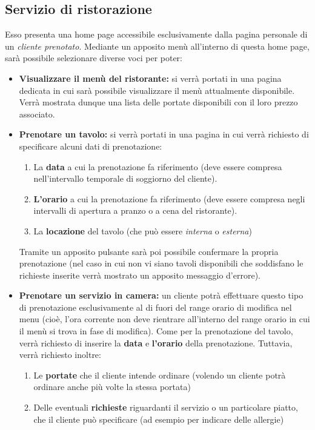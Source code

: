 \documentclass [a4paper, 12pt]{book}
\begin{document}
\subsection{Servizio di ristorazione}
\label{ServizioRistorazione}
Esso presenta una home page accessibile esclusivamente dalla pagina personale di un \textit{cliente prenotato}. Mediante un apposito menù all'interno di questa home page, sarà possibile selezionare diverse voci per poter:
\begin{itemize}
\item \textbf{Visualizzare il menù del ristorante:} si verrà portati in una pagina dedicata in cui sarà possibile visualizzare il menù attualmente disponibile. Verrà mostrata dunque una lista delle portate disponibili con il loro prezzo associato.
\item \textbf{Prenotare un tavolo:} si verrà portati in una pagina in cui verrà richiesto di specificare alcuni dati di prenotazione:
\begin{enumerate}
\item La \textbf{data} a cui la prenotazione fa riferimento (deve essere compresa nell'intervallo temporale di soggiorno del cliente).
\item \textbf{L'orario} a cui la prenotazione fa riferimento (deve essere compresa negli intervalli di apertura a pranzo o a cena del ristorante).
\item La \textbf{locazione} del tavolo (che può essere \textit{interna} o \textit{esterna})
\end{enumerate}
Tramite un apposito pulsante sarà poi possibile confermare la propria prenotazione (nel caso in cui non vi siano tavoli disponibili che soddisfano le richieste inserite verrà mostrato un apposito messaggio d'errore).
\item \textbf{Prenotare un servizio in camera:} un cliente potrà effettuare questo tipo di prenotazione esclusivamente al di fuori del range orario di modifica nel menu (cioè, l'ora corrente non deve rientrare all'interno del range orario in cui il menù si trova in fase di modifica). Come per la prenotazione del tavolo, verrà richiesto di inserire la \textbf{data} e \textbf{l'orario} della prenotazione. Tuttavia, verrà richiesto inoltre:
\begin{enumerate}
\item Le \textbf{portate} che il cliente intende ordinare (volendo un cliente potrà ordinare anche più volte la stessa portata)
\item Delle eventuali \textbf{richieste} riguardanti il servizio o un particolare piatto, che il cliente può specificare (ad esempio per indicare delle allergie) 

\end{enumerate}
\end{itemize}
\end{document}
